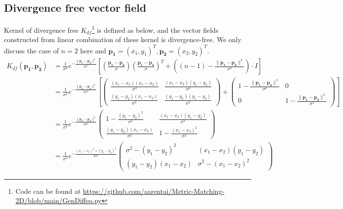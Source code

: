 \documentclass{article}
\theoremstyle{definition}
\theoremstyle{plain}
\begin{document}
\subsection{Divergence free vector field\cite{macedo}}
Kernel of divergence free $K_{df}$\footnote{Code can be found at \url{https://github.com/aarentai/Metric-Matching-2D/blob/main/GenDiffeo.py}} is defined as below, and the vector fields constructed from linear combination of these kernel is divergence-free. We only discuss the case of $n=2$ here and $\mathbf{p_1}=(x_1,y_1)^T, \mathbf{p_2}=(x_2,y_2)^T$.
\begin{align*}
    K_{df}(\mathbf{p_1},\mathbf{p_2})&=\frac{1}{\sigma^2}e^{-\frac{\|\mathbf{p_1}-\mathbf{p_2}\|^2}{2\sigma^2}}\left[\left(\frac{\mathbf{p_1}-\mathbf{p_2}}{\sigma}\right)\left(\frac{\mathbf{p_1}-\mathbf{p_2}}{\sigma}\right)^T+\left((n-1)-\frac{\|\mathbf{p_1}-\mathbf{p_2}\|^2}{\sigma^2}\right)\cdot I\right]\\
    &=\frac{1}{\sigma^2}e^{-\frac{\|\mathbf{p_1}-\mathbf{p_2}\|^2}{2\sigma^2}}
    \left[
    \begin{pmatrix}
    \frac{(x_1-x_2)(x_1-x_2)}{\sigma^2} & \frac{(x_1-x_2)(y_1-y_2)}{\sigma^2}\\
    \frac{(y_1-y_2)(x_1-x_2)}{\sigma^2} & \frac{(y_1-y_2)(y_1-y_2)}{\sigma^2}
    \end{pmatrix}
    +
    \begin{pmatrix}
    1-\frac{\|\mathbf{p_1}-\mathbf{p_2}\|^2}{\sigma^2} & 0\\
    0 & 1-\frac{\|\mathbf{p_1}-\mathbf{p_2}\|^2}{\sigma^2}
    \end{pmatrix}
    \right]\\
    &=\frac{1}{\sigma^2}e^{-\frac{\|\mathbf{p_1}-\mathbf{p_2}\|^2}{2\sigma^2}}
    \begin{pmatrix}
    1-\frac{(y_1-y_2)^2}{\sigma^2} & \frac{(x_1-x_2)(y_1-y_2)}{\sigma^2}\\
    \frac{(y_1-y_2)(x_1-x_2)}{\sigma^2} & 1-\frac{(x_1-x_2)^2}{\sigma^2}
    \end{pmatrix}\\
    &=\frac{1}{\sigma^4}e^{-\frac{(x_1-x_2)^2+(y_1-y_2)^2}{2\sigma^2}}
    \begin{pmatrix}
    \sigma^2-(y_1-y_2)^2 & (x_1-x_2)(y_1-y_2)\\
    (y_1-y_2)(x_1-x_2) & \sigma^2-(x_1-x_2)^2
    \end{pmatrix}
\end{align*}
\end{document}
